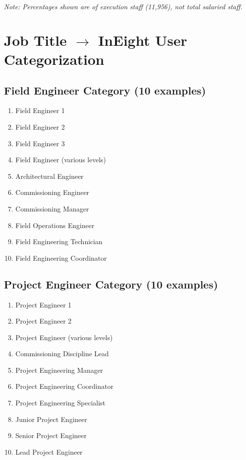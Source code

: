 \documentclass[11pt, letterpaper]{article}
\begin{document}
\vspace{0.5em}
{\footnotesize \textit{Note: Percentages shown are of execution staff (11,956), not total salaried staff.}}

\newpage

\section*{Job Title $\rightarrow$ InEight User Categorization}

\subsection*{Field Engineer Category (10 examples)}
\begin{enumerate}[nosep, leftmargin=2em]
    \item Field Engineer 1
    \item Field Engineer 2
    \item Field Engineer 3
    \item Field Engineer (various levels)
    \item Architectural Engineer
    \item Commissioning Engineer
    \item Commissioning Manager
    \item Field Operations Engineer
    \item Field Engineering Technician
    \item Field Engineering Coordinator
\end{enumerate}

\subsection*{Project Engineer Category (10 examples)}
\begin{enumerate}[nosep, leftmargin=2em]
    \item Project Engineer 1
    \item Project Engineer 2
    \item Project Engineer (various levels)
    \item Commissioning Discipline Lead
    \item Project Engineering Manager
    \item Project Engineering Coordinator
    \item Project Engineering Specialist
    \item Junior Project Engineer
    \item Senior Project Engineer
    \item Lead Project Engineer
\end{enumerate}
\end{document}
